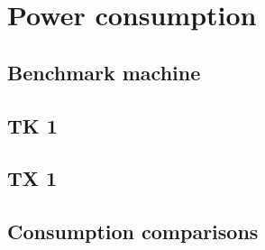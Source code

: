 \chapter{Power consumption}\label{ch:power}

\section{Benchmark machine}

\section{TK 1}

\section{TX 1}

\section{Consumption comparisons}